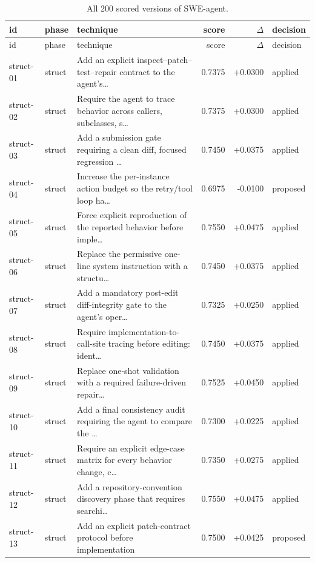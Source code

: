 \begin{center}\scriptsize\begin{longtable}{llp{5.2cm}rrl}
\caption{All 200 scored versions of SWE-agent.}\\
\toprule id & phase & technique & score & $\Delta$ & decision \\ \midrule \endfirsthead
\toprule id & phase & technique & score & $\Delta$ & decision \\ \midrule \endhead
struct-01 & struct & Add an explicit inspect–patch–test–repair contract to the agent's\ldots{} & 0.7375 & +0.0300 & applied \\
struct-02 & struct & Require the agent to trace behavior across callers, subclasses, s\ldots{} & 0.7375 & +0.0300 & applied \\
struct-03 & struct & Add a submission gate requiring a clean diff, focused regression \ldots{} & 0.7450 & +0.0375 & applied \\
struct-04 & struct & Increase the per-instance action budget so the retry/tool loop ha\ldots{} & 0.6975 & -0.0100 & proposed \\
struct-05 & struct & Force explicit reproduction of the reported behavior before imple\ldots{} & 0.7550 & +0.0475 & applied \\
struct-06 & struct & Replace the permissive one-line system instruction with a structu\ldots{} & 0.7450 & +0.0375 & applied \\
struct-07 & struct & Add a mandatory post-edit diff-integrity gate to the agent's oper\ldots{} & 0.7325 & +0.0250 & applied \\
struct-08 & struct & Require implementation-to-call-site tracing before editing: ident\ldots{} & 0.7450 & +0.0375 & applied \\
struct-09 & struct & Replace one-shot validation with a required failure-driven repair\ldots{} & 0.7525 & +0.0450 & applied \\
struct-10 & struct & Add a final consistency audit requiring the agent to compare the \ldots{} & 0.7300 & +0.0225 & applied \\
struct-11 & struct & Require an explicit edge-case matrix for every behavior change, c\ldots{} & 0.7350 & +0.0275 & applied \\
struct-12 & struct & Add a repository-convention discovery phase that requires searchi\ldots{} & 0.7550 & +0.0475 & applied \\
struct-13 & struct & Add an explicit patch-contract protocol before implementation & 0.7500 & +0.0425 & proposed \\

\end{longtable}
\end{center}

